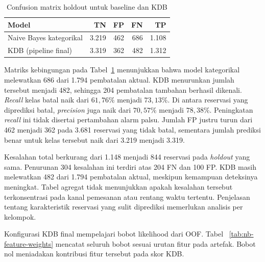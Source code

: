 \begin{table}[H]
    \centering
    \caption{Confusion matrix holdout untuk baseline dan KDB}
    \label{tab:nb-confusion}
    \begin{tabular}{lrrrr}
        \hline
        Model                   & TN    & FP  & FN  & TP    \\
        \hline
        Naive Bayes kategorikal & 3.219 & 462 & 686 & 1.108 \\
        KDB (pipeline final)    & 3.319 & 362 & 482 & 1.312 \\
        \hline
    \end{tabular}
\end{table}

Matriks kebingungan pada Tabel~\ref{tab:nb-confusion} menunjukkan bahwa
model kategorikal melewatkan 686 dari 1.794 pembatalan aktual. KDB
menurunkan jumlah tersebut menjadi 482, sehingga 204 pembatalan tambahan
berhasil dikenali. \textit{Recall} kelas batal naik dari $61{,}76\%$
menjadi $73{,}13\%$. Di antara reservasi yang diprediksi batal,
\textit{precision} juga naik dari $70{,}57\%$ menjadi $78{,}38\%$.
Peningkatan \textit{recall} ini tidak disertai pertambahan alarm palsu.
Jumlah FP justru turun dari 462 menjadi 362 pada 3.681 reservasi yang
tidak batal, sementara jumlah prediksi benar untuk kelas tersebut naik
dari 3.219 menjadi 3.319.

Kesalahan total berkurang dari 1.148 menjadi 844 reservasi pada
\textit{holdout} yang sama. Penurunan 304 kesalahan ini terdiri atas 204
FN dan 100 FP. KDB masih melewatkan 482 dari 1.794 pembatalan aktual,
meskipun kemampuan deteksinya meningkat. Tabel agregat
tidak menunjukkan apakah kesalahan tersebut terkonsentrasi pada kanal
pemesanan atau rentang waktu tertentu. Penjelasan tentang karakteristik
reservasi yang sulit diprediksi memerlukan analisis per kelompok.

Konfigurasi KDB final mempelajari bobot likelihood dari OOF. Tabel
~\ref{tab:nb-feature-weights} mencatat seluruh bobot sesuai urutan fitur pada
artefak. Bobot nol meniadakan kontribusi fitur tersebut pada skor KDB.


